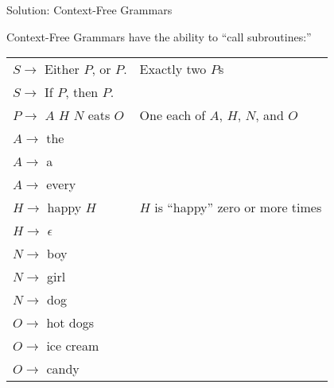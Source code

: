 \documentclass{plt}
\begin{document}
\begin{frame}{Solution: Context-Free Grammars}

Context-Free Grammars have the ability to ``call subroutines:''

{\ttfamily
\begin{tabular}{ll}
$S \rightarrow$ Either $P$, or $P$. & \rmfamily \alert{Exactly two $P$s}\\
$S \rightarrow$ If $P$, then $P$. \\
$P \rightarrow$ $A$ $H$ $N$ eats $O$ & \rmfamily \alert{One each of $A$, $H$, $N$, and
    $O$} \\
$A \rightarrow$ the \\
$A \rightarrow$ a \\
$A \rightarrow$ every \\
$H \rightarrow$ happy $H$ & \rmfamily \alert{$H$ is ``happy'' zero or more times} \\
$H \rightarrow$ $\epsilon$ \\
$N \rightarrow$ boy \\
$N \rightarrow$ girl \\
$N \rightarrow$ dog \\
$O \rightarrow$ hot dogs \\
$O \rightarrow$ ice cream \\
$O \rightarrow$ candy \\
\end{tabular}
}

\end{frame}

\def\tok#1{\textbf{\texttt{#1}}}
\end{document}
